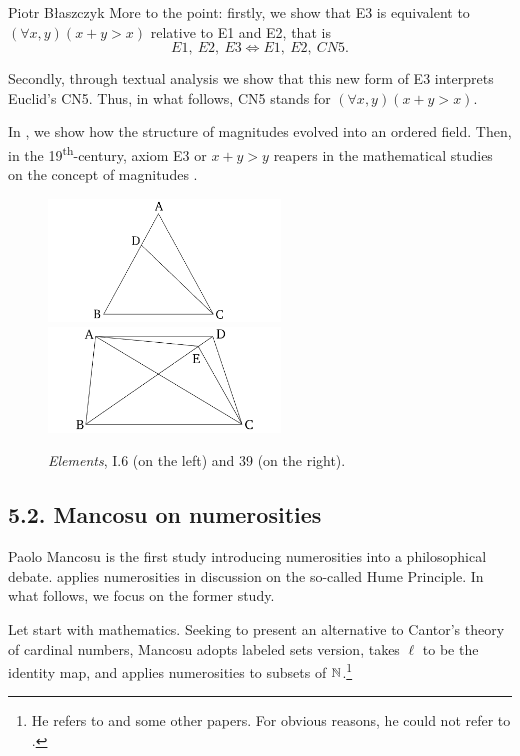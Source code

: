 \begin{artengenv}{Piotr Błaszczyk}
More to the point: firstly, we show that E3 is equivalent to  $(\forall x,y)(x+y>x)$ relative to E1 and E2, that is
\[E1,\ E2,\ E3 \Leftrightarrow E1,\ E2,\ CN5.\]

Secondly, through textual analysis we show that  this new form of E3  interprets Euclid's CN5.
Thus, in what follows, CN5 stands for $(\forall x,y)(x+y>x)$. 


In \parencite{ref_bf}, we show how the structure of magnitudes evolved into an ordered field. Then, in the 19\textsuperscript{th}-century, axiom E3 or $x+y>y$ reapers in the mathematical studies on the concept of magnitudes \parencite[\S\,6]{ref_bf}.

\begin{figure}
\centerline{\includegraphics[width=0.55\textwidth]{blaszczyk/bla-fig1a} \includegraphics[width=0.55\textwidth]{blaszczyk/bla-fig1b}}
\caption{\textit{Elements}, I.6 (on the left) and 39 (on the right).}
\label{figCN5}
\end{figure}
\subsection{5.2. Mancosu on numerosities}

Paolo Mancosu \parencite*{ref_pm09} is the first study introducing numerosities into a philosophical debate. 
\parencite{ref_pm16} applies numerosities in discussion on the so-called Hume Principle. In what follows, we focus on the former study.


Let start with mathematics. Seeking to present an alternative to Cantor's theory of cardinal numbers, Mancosu adopts labeled sets version, takes $\ell$ to be the identity map, and applies numerosities to subsets of ${\mathbb{N}}$.\footnote{He refers to \parencites{ref_BN03}{ref_BN06}{ref_BN07} and some other papers. For obvious reasons, he could not refer  to \parencite{ref_BN19}.}


\end{artengenv}

